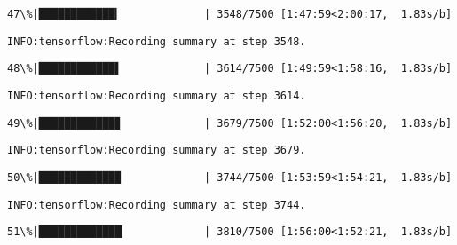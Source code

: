 \documentclass[11pt]{article}
\begin{document}
    \begin{Verbatim}[commandchars=\\\{\}]
 47\%|████████████▎             | 3548/7500 [1:47:59<2:00:17,  1.83s/b]
    \end{Verbatim}

    \begin{Verbatim}[commandchars=\\\{\}]
INFO:tensorflow:Recording summary at step 3548.

    \end{Verbatim}

    \begin{Verbatim}[commandchars=\\\{\}]
 48\%|████████████▌             | 3614/7500 [1:49:59<1:58:16,  1.83s/b]
    \end{Verbatim}

    \begin{Verbatim}[commandchars=\\\{\}]
INFO:tensorflow:Recording summary at step 3614.

    \end{Verbatim}

    \begin{Verbatim}[commandchars=\\\{\}]
 49\%|████████████▊             | 3679/7500 [1:52:00<1:56:20,  1.83s/b]
    \end{Verbatim}

    \begin{Verbatim}[commandchars=\\\{\}]
INFO:tensorflow:Recording summary at step 3679.

    \end{Verbatim}

    \begin{Verbatim}[commandchars=\\\{\}]
 50\%|████████████▉             | 3744/7500 [1:53:59<1:54:21,  1.83s/b]
    \end{Verbatim}

    \begin{Verbatim}[commandchars=\\\{\}]
INFO:tensorflow:Recording summary at step 3744.

    \end{Verbatim}

    \begin{Verbatim}[commandchars=\\\{\}]
 51\%|█████████████▏            | 3810/7500 [1:56:00<1:52:21,  1.83s/b]
    \end{Verbatim}
\end{document}
